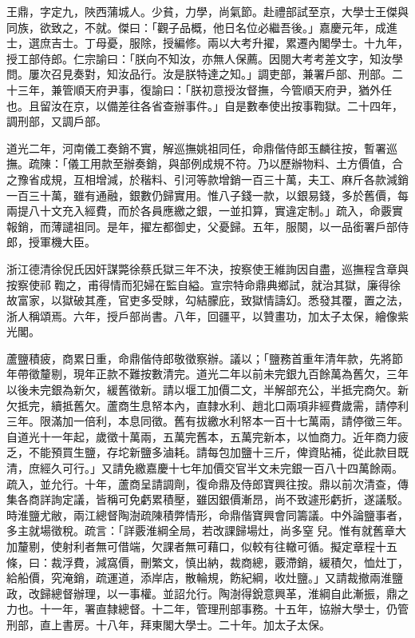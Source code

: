 \begin{pinyinscope}
王鼎，字定九，陜西蒲城人。少貧，力學，尚氣節。赴禮部試至京，大學士王傑與同族，欲致之，不就。傑曰：「觀子品概，他日名位必繼吾後。」嘉慶元年，成進士，選庶吉士。丁母憂，服除，授編修。兩以大考升擢，累遷內閣學士。十九年，授工部侍郎。仁宗諭曰：「朕向不知汝，亦無人保薦。因閱大考考差文字，知汝學問。屢次召見奏對，知汝品行。汝是朕特達之知。」調吏部，兼署戶部、刑部。二十三年，兼管順天府尹事，復諭曰：「朕初意授汝督撫，今管順天府尹，猶外任也。且留汝在京，以備差往各省查辦事件。」自是數奉使出按事鞫獄。二十四年，調刑部，又調戶部。

道光二年，河南儀工奏銷不實，解巡撫姚祖同任，命鼎偕侍郎玉麟往按，暫署巡撫。疏陳：「儀工用款至辦奏銷，與部例成規不符。乃以歷辦物料、土方價值，合之豫省成規，互相增減，於稭料、引河等款增銷一百三十萬，夫工、麻斤各款減銷一百三十萬，雖有通融，銀數仍歸實用。惟八子錢一款，以銀易錢，多於舊價，每兩提八十文充入經費，而於各員應繳之銀，一並扣算，實違定制。」疏入，命覈實報銷，而薄譴祖同。是年，擢左都御史，父憂歸。五年，服闋，以一品銜署戶部侍郎，授軍機大臣。

浙江德清徐倪氏因奸謀斃徐蔡氏獄三年不決，按察使王維詢因自盡，巡撫程含章與按察使祁鞫之，甫得情而犯婦在監自縊。宣宗特命鼎典鄉試，就治其獄，廉得徐故富家，以獄破其產，官吏多受賕，勾結朦庇，致獄情譸幻。悉發其覆，置之法，浙人稱頌焉。六年，授戶部尚書。八年，回疆平，以贊畫功，加太子太保，繪像紫光閣。

蘆鹽積疲，商累日重，命鼎偕侍郎敬徵察辦。議以；「鹽務首重年清年款，先將節年帶徵釐剔，現年正款不難按數清完。道光二年以前未完銀九百餘萬為舊欠，三年以後未完銀為新欠，緩舊徵新。請以堰工加價二文，半解部充公，半抵完商欠。新欠抵完，續抵舊欠。蘆商生息帑本內，直隸水利、趙北口兩項非經費歲需，請停利三年。限滿加一倍利，本息同徵。舊有拔繳水利帑本一百十七萬兩，請停徵三年。自道光十一年起，歲徵十萬兩，五萬完舊本，五萬完新本，以恤商力。近年商力疲乏，不能預買生鹽，存坨新鹽多滷耗。請每包加鹽十三斤，俾資貼補，從此款目既清，庶經久可行。」又請免繳嘉慶十七年加價交官半文未完銀一百八十四萬餘兩。疏入，並允行。十年，蘆商呈請調劑，復命鼎及侍郎寶興往按。鼎以前次清查，傳集各商詳詢定議，皆稱可免虧累積壓，雖因銀價漸昂，尚不致遽形虧折，遂議駁。時淮鹽尤敝，兩江總督陶澍疏陳積弊情形，命鼎偕寶興會同籌議。中外論鹽事者，多主就場徵稅。疏言：「詳覈淮綱全局，若改課歸場灶，尚多窒兒。惟有就舊章大加釐剔，使射利者無可借端，欠課者無可藉口，似較有往轍可循。擬定章程十五條，曰：裁浮費，減窩價，刪繁文，慎出納，裁商總，覈滯銷，緩積欠，恤灶丁，給船價，究淹銷，疏運道，添岸店，散輪規，飭紀綱，收灶鹽。」又請裁撤兩淮鹽政，改歸總督辦理，以一事權。並詔允行。陶澍得銳意興革，淮綱自此漸振，鼎之力也。十一年，署直隸總督。十二年，管理刑部事務。十五年，協辦大學士，仍管刑部，直上書房。十八年，拜東閣大學士。二十年。加太子太保。


\end{pinyinscope}
